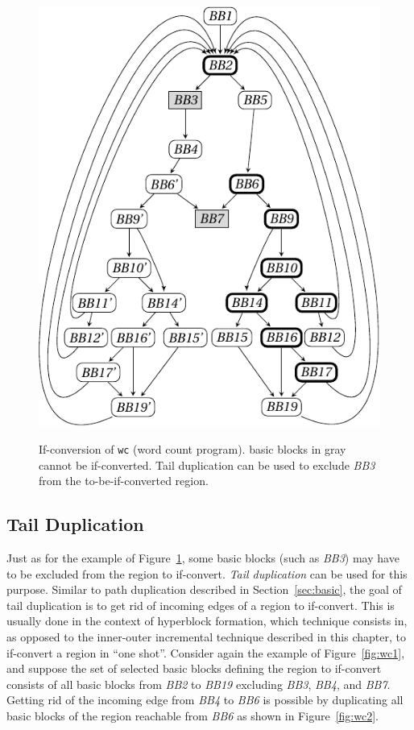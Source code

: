 \begin{figure}
{    \includegraphics[scale=0.7]{graph_c}
    \label{fig:wc3}}
\caption{\label{fig:wc example}If-conversion of \texttt{wc} (word count program). basic blocks in gray cannot be if-converted. Tail duplication can be used to exclude \textit{BB3} from the to-be-if-converted region.}
\end{figure}


\subsection{Tail Duplication}

Just as for the example of Figure~\ref{fig:wc example}, some basic blocks (such as \textit{BB3}) may have to be excluded from the region to if-convert. \emph{Tail duplication} can be used for this purpose. Similar to path duplication described in Section~\ref{sec:basic}, the goal of tail duplication is to get rid of incoming edges of a region to if-convert. This is usually done in the context of hyperblock formation, which technique consists in, as opposed to the inner-outer incremental technique described in this chapter, to if-convert a region in ``one shot''. Consider again the example of Figure~\ref{fig:wc1}, and suppose the set of selected basic blocks defining the region to if-convert consists of all basic blocks from \textit{BB2} to \textit{BB19} excluding \textit{BB3}, \textit{BB4}, and \textit{BB7}. Getting rid of the incoming edge from \textit{BB4} to \textit{BB6} is possible by duplicating all basic blocks of the region reachable from \textit{BB6} as shown in Figure~\ref{fig:wc2}. 

